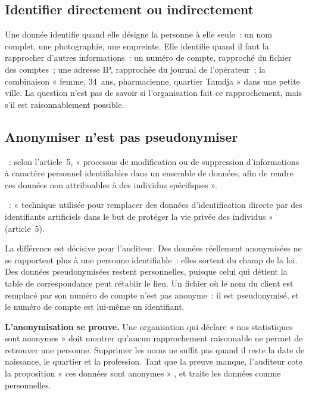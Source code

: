 \subsection{Identifier directement ou indirectement}

Une donnée identifie  quand elle désigne la personne à
elle seule~: un nom complet, une photographie, une empreinte. Elle identifie
 quand il faut la rapprocher d'autres informations~:
un numéro de compte, rapproché du fichier des comptes~; une adresse IP,
rapprochée du journal de l'opérateur~; la combinaison « femme, 34~ans,
pharmacienne, quartier Tamdja » dans une petite ville. La question n'est pas
de savoir si l'organisation fait ce rapprochement, mais s'il est
raisonnablement possible.

\subsection{Anonymiser n'est pas pseudonymiser}

\begin{boxdef}
~: selon l'article~5, « processus de modification ou
de suppression d'informations à caractère personnel identifiables dans un
ensemble de données, afin de rendre ces données non attribuables à des
individus spécifiques ».

\smallskip
{}~: « technique utilisée pour remplacer des
données d'identification directe par des identifiants artificiels dans le
but de protéger la vie privée des individus » (article~5).
\end{boxdef}

La différence est décisive pour l'auditeur. Des données réellement
anonymisées ne se rapportent plus à une personne identifiable~: elles
sortent du champ de la loi. Des données pseudonymisées restent
personnelles, puisque celui qui détient la table de correspondance peut
rétablir le lien. Un fichier où le nom du client est remplacé par son
numéro de compte n'est pas anonyme~: il est pseudonymisé, et le
numéro de compte est lui-même un identifiant.

\begin{boxinfo}
\textbf{L'anonymisation se prouve.} Une organisation qui déclare « nos
statistiques sont anonymes » doit montrer qu'aucun rapprochement raisonnable
ne permet de retrouver une personne. Supprimer les noms ne suffit pas quand
il reste la date de naissance, le quartier et la profession. Tant que la
preuve manque, l'auditeur cote la proposition « ces données sont anonymes »
\NEK{}, et traite les données comme personnelles.
\end{boxinfo}

